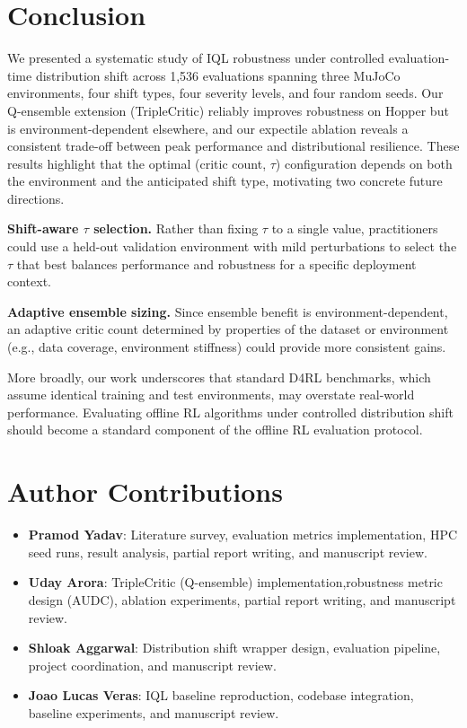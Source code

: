 \documentclass[conference]{IEEEtran}
\begin{document}
\section{Conclusion}
\label{sec:conclusion}

We presented a systematic study of IQL robustness under controlled
evaluation-time distribution shift across 1,536 evaluations spanning three
MuJoCo environments, four shift types, four severity levels, and four random
seeds. Our Q-ensemble extension (TripleCritic) reliably improves robustness
on Hopper but is environment-dependent elsewhere, and our expectile ablation
reveals a consistent trade-off between peak performance and distributional
resilience. These results highlight that the optimal (critic count, $\tau$)
configuration depends on both the environment and the anticipated shift type,
motivating two concrete future directions.

\textbf{Shift-aware $\tau$ selection.} Rather than fixing $\tau$ to a single
value, practitioners could use a held-out validation environment with mild
perturbations to select the $\tau$ that best balances performance and
robustness for a specific deployment context.

\textbf{Adaptive ensemble sizing.} Since ensemble benefit is
environment-dependent, an adaptive critic count determined by properties of
the dataset or environment (e.g., data coverage, environment stiffness) could
provide more consistent gains.

More broadly, our work underscores that standard D4RL benchmarks, which assume
identical training and test environments, may overstate real-world performance.
Evaluating offline RL algorithms under controlled distribution shift should
become a standard component of the offline RL evaluation protocol.

\section*{Author Contributions}

\begin{itemize}
  \item \textbf{Pramod Yadav}: Literature survey, evaluation metrics implementation, HPC seed runs, result analysis, partial report writing, and manuscript review.
  \item \textbf{Uday Arora}: TripleCritic (Q-ensemble) implementation,robustness metric design (AUDC), ablation experiments, partial report writing, and manuscript review.
  \item \textbf{Shloak Aggarwal}: Distribution shift wrapper design, evaluation pipeline, project coordination, and manuscript review.
  \item \textbf{Joao Lucas Veras}: IQL baseline reproduction, codebase integration, baseline experiments, and manuscript review.
\end{itemize}
\newpage
\end{document}
